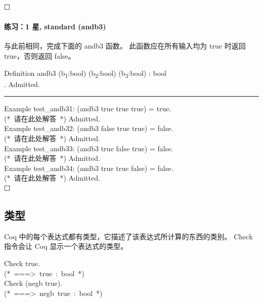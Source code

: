 \documentclass[utf8]{ctexart}
\let\oldparagraph\paragraph
\renewcommand{\paragraph}[1]{\oldparagraph{#1}\mbox{}}
\begin{document}
{☐}

\protect\hypertarget{lab25}{}{}

\hypertarget{ux7ec3ux4e601-ux661f-standard-andb3}{%
\paragraph{练习：1 星, standard
(andb3)}\label{ux7ec3ux4e601-ux661f-standard-andb3}}

与此前相同，完成下面的 {{andb3}} 函数。 此函数应在所有输入均为 {{true}}
时返回 {{true}}，否则返回 {{false}}。

{Definition} {andb3} ({b\textsubscript{1}}:{bool})
({b\textsubscript{2}}:{bool}) ({b\textsubscript{3}}:{bool}) : {bool}\\
\hspace*{0.333em}\hspace*{0.333em}{(*~将本行替换成~":=~\_你的\_定义\_~."~*)}.
{Admitted}.\\

\begin{center}\rule{0.5\linewidth}{\linethickness}\end{center}

{Example} {test\_andb31}: ({andb3} {true} {true} {true}) = {true}.\\
{(*~请在此处解答~*)} {Admitted}.\\
{Example} {test\_andb32}: ({andb3} {false} {true} {true}) = {false}.\\
{(*~请在此处解答~*)} {Admitted}.\\
{Example} {test\_andb33}: ({andb3} {true} {false} {true}) = {false}.\\
{(*~请在此处解答~*)} {Admitted}.\\
{Example} {test\_andb34}: ({andb3} {true} {true} {false}) = {false}.\\
{(*~请在此处解答~*)} {Admitted}.\\

{☐}

\protect\hypertarget{lab26}{}{}

\hypertarget{ux7c7bux578b}{%
\subsection{类型}\label{ux7c7bux578b}}

Coq 中的每个表达式都有类型，它描述了该表达式所计算的东西的类别。
{{Check}} 指令会让 Coq 显示一个表达式的类型。

{Check} {true}.\\
{(*~===\textgreater~true~:~bool~*)}\\
{Check} ({negb} {true}).\\
{(*~===\textgreater~negb~true~:~bool~*)}\\
\end{document}
